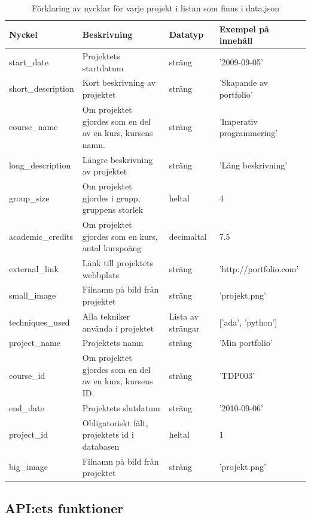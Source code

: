 \documentclass{TDP003mall}
\begin{document}
\begin{table}[!h]
\renewcommand{\arraystretch}{1.5}
\begin{tabularx}{\linewidth}{|l|X|l|l|}
\hline
Nyckel & Beskrivning & Datatyp & Exempel på innehåll \\
\hline
start\_date & Projektets startdatum & sträng & '2009-09-05' \\
\hline
short\_description & Kort beskrivning av projektet & sträng & 'Skapande av portfolio' \\
\hline
course\_name & Om projektet gjordes som en del av en kurs, kursens namn. & sträng & 'Imperativ programmering' \\
\hline
long\_description & Längre beskrivning av projektet & sträng & 'Lång beskrivning' \\
\hline
group\_size & Om projektet gjordes i grupp, gruppens storlek & heltal & 4 \\
\hline
academic\_credits & Om projektet gjordes som en kurs, antal kurspoäng & decimaltal & 7.5  \\
\hline
external\_link & Länk till projektets webbplats & sträng & 'http://portfolio.com' \\
\hline
small\_image & Filnamn på bild från projektet & sträng & 'projekt.png' \\
\hline
techniques\_used & Alla tekniker använda i projektet & Lista av strängar & ['ada', 'python'] \\
\hline
project\_name & Projektets namn & sträng & 'Min portfolio' \\
\hline
course\_id & Om projektet gjordes som en del av en kurs, kursens ID. & sträng & 'TDP003' \\
\hline
end\_date & Projektets slutdatum & sträng & '2010-09-06' \\
\hline
project\_id & Obligatoriskt fält, projektets id i databasen & heltal & 1 \\
\hline
big\_image & Filnamn på bild från projektet & sträng & 'projekt.png' \\
\hline

\end{tabularx}
\caption{Förklaring av nycklar för varje projekt i listan som finns i data.json}
\label{table:datafile}
\end{table}


\subsection{API:ets funktioner}
\end{document}
